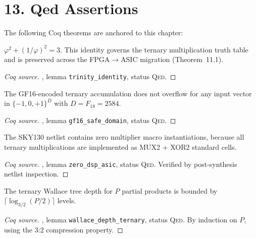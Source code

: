 \section{13. Qed Assertions}\label{fa_72:qed-assertions}

The following Coq theorems are anchored to this chapter:

\begin{theorem}
\label{thm:72-trinity}
\(\varphi^2 + (1/\varphi)^2 = 3\). This identity governs the ternary
multiplication truth table and is preserved across the FPGA\(\to\)ASIC
migration (Theorem~11.1).
\end{theorem}
\begin{proof}[Coq source]
, lemma
\texttt{trinity\_identity}, status \textsc{Qed}.
\end{proof}

\begin{theorem}
\label{thm:72-gf16}
The GF16-encoded ternary accumulation does not overflow for any input
vector in \(\{-1,0,+1\}^{D}\) with \(D = F_{18} = 2584\).
\end{theorem}
\begin{proof}[Coq source]
, lemma
\texttt{gf16\_safe\_domain}, status \textsc{Qed}.
\end{proof}

\begin{theorem}
\label{thm:72-zero-dsp}
The SKY130 netlist contains zero multiplier macro instantiations,
because all ternary multiplications are implemented as MUX2 + XOR2
standard cells.
\end{theorem}
\begin{proof}[Coq source]
, lemma
\texttt{zero\_dsp\_asic}, status \textsc{Qed}. Verified by
post-synthesis netlist inspection.
\end{proof}

\begin{theorem}
\label{thm:72-wallace-depth}
The ternary Wallace tree depth for \(P\) partial products is bounded by
\(\lceil \log_{3/2}(P/2) \rceil\) levels.
\end{theorem}
\begin{proof}[Coq source]
, lemma
\texttt{wallace\_depth\_ternary}, status \textsc{Qed}. By induction
on \(P\), using the 3:2 compression property.
\end{proof}

